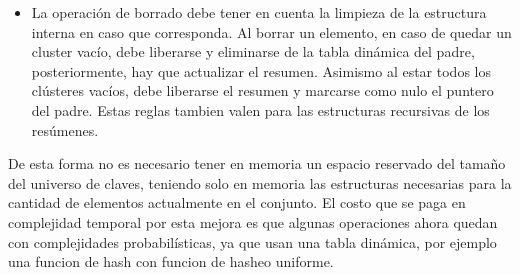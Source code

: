 \documentclass[10pt,a4paper]{article}
\begin{document}
\begin{itemize}
\begin{enumerate}
        \item El cluster donde se va a insertar x corresponde a un vEB de tamaño mayor que 2 no vacío: En este caso el resumen ya contiene la información acerca de este cluster. Asi que solo resta insertar el elemento recursivamente. En este caso al estar no vacío, esta llamada no cambia respecto del árbol original.
        
    \end{enumerate}
    Notemos que entonces, en la operacion de inserción a lo sumo se crean un resumen y n clusters, al tener tablas dinámicas en lugar de arreglos y no tener mas hijos, es decir, instanciar un solo nivel de recursion hacia abajo, la memoria consumida en cada llamada a inserción es a lo sumo $\mathcal{O}(1)$. Totalizando un espacio máximo consumido por inserción de órden $\mathcal{O}(n)$. De esta forma un árbol vacío consume espacio O(1) y a medida que agregamos elementos, el espacio consumido queda en función de n\footnote{Cantidad de elementos en el arbol} \footnote{Asumiendo limpieza de estructuras innecesarias en borrado}
    
\item La operación de borrado debe tener en cuenta la limpieza de la estructura interna en caso que corresponda. Al borrar un elemento, en caso de quedar un cluster vacío, debe liberarse y eliminarse de la tabla dinámica del padre, posteriormente, hay que actualizar el resumen. Asimismo al estar todos los clústeres vacíos, debe liberarse el resumen y marcarse como nulo el puntero del padre. Estas reglas tambien valen para las estructuras recursivas de los resúmenes.

\end{itemize}

De esta forma no es necesario tener en memoria un espacio reservado del tamaño del universo de claves, teniendo solo en memoria las estructuras necesarias para la cantidad de elementos actualmente en el conjunto. El costo que se paga en complejidad temporal por esta mejora es que algunas operaciones ahora quedan con complejidades probabilísticas, ya que usan una tabla dinámica, por ejemplo una funcion de hash con funcion de hasheo uniforme.
\end{document}
